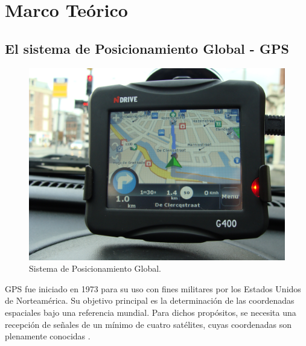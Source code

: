 
\chapter{Marco Teórico} %

\label{Chap:Marco} %




\section{El sistema de Posicionamiento Global - GPS}

\begin{figure}[ht]
\centering
\includegraphics[scale=0.07]{Figures/GPS}
\caption[Sistema de Posicionamiento Global.]{Sistema de Posicionamiento Global.}
\label{fig:GPS}
\end{figure}

GPS fue iniciado en 1973 para su uso con fines militares por los Estados Unidos de Norteamérica. Su objetivo principal es la determinación de las coordenadas espaciales bajo una referencia mundial. Para dichos propósitos, se necesita una recepción de señales de un mínimo de cuatro satélites, cuyas coordenadas son plenamente conocidas \cite{huerta2005gps}.

